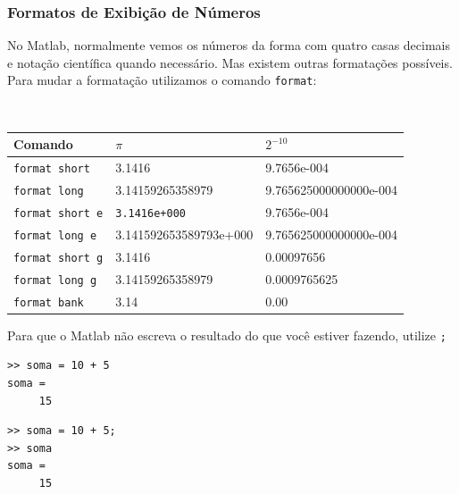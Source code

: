 \documentclass{beamer}
\begin{document}
\begin{frame}[fragile]

\frametitle{Formatos de Exibi\c{c}\~ao de N\'umeros}
{\small
No Matlab, normalmente vemos os n\'umeros da forma com quatro casas decimais e nota\c{c}\~ao cient\'ifica quando necess\'ario. Mas existem outras formata\c{c}\~oes poss\'iveis. Para mudar a formata\c{c}\~ao utilizamos o comando {\tt format}:
}
\pause

{\scriptsize \tt
\begin{center}
\begin{tabular}{|l|l|l|}
\hline
{\normalfont Comando} & $\pi$ & $2^{-10}$ \\ \hline
{\tt format short} & 3.1416 & 9.7656e-004 \\ \hline
{\tt format long} & 3.14159265358979 & 9.765625000000000e-004 \\ \hline
{\tt format short e} & {\tt 3.1416e+000} & 9.7656e-004 \\ \hline
{\tt format long e} & 3.141592653589793e+000 & 9.765625000000000e-004 \\ \hline
{\tt format short g} & 3.1416 & 0.00097656 \\ \hline
{\tt format long g} & 3.14159265358979 & 0.0009765625 \\ \hline
{\tt format bank} & 3.14 & 0.00 \\ \hline
\end{tabular}
\end{center}
}
\pause

{\scriptsize
Para que o Matlab n\~ao escreva o resultado do que voc\^e estiver fazendo, utilize {\tt ;}
\pause

\begin{center}
\begin{minipage}{4 cm}
\begin{verbatim}
>> soma = 10 + 5
soma =
     15
\end{verbatim}
\end{minipage}
\begin{minipage}{4 cm}
\begin{verbatim}
>> soma = 10 + 5;
>> soma
soma =
     15
\end{verbatim}
\end{minipage}
\end{center}
}

\end{frame}
\end{document}
